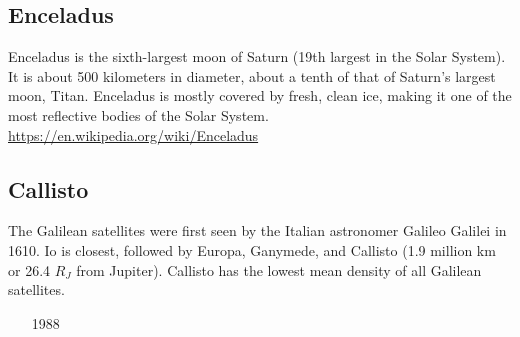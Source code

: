 \subsection{Enceladus}

Enceladus is the sixth-largest moon of Saturn (19th largest in the Solar System). 
It is about 500 kilometers in diameter, about a tenth of that of Saturn's largest moon, Titan. 
Enceladus is mostly covered by fresh, clean ice, making it one of the most reflective bodies 
of the Solar System. 
\url{https://en.wikipedia.org/wiki/Enceladus}

\begin{scriptsize}
\begin{itemize}
\item[\twothousandeight] 
\item[\twothousandnine]
\item[\twothousandten]
\item[\twothousandtwelve] 
\item[\twothousandthirteen] 
\item[\twothousandfourteen]
\end{itemize}
\end{scriptsize}

\subsection{Callisto}

The Galilean satellites were first seen by the Italian astronomer Galileo Galilei in 1610. 
Io is closest, followed by Europa, Ganymede, and Callisto (1.9 million km or
26.4 $R_J$ from Jupiter). Callisto has the lowest mean density of all Galilean satellites.

\begin{scriptsize}
\begin{itemize}
\item[1988]
\item[\twothousandfour]
\item[\twothousandfive]
\item[\twothousandsix]
\end{itemize}
\end{scriptsize}

